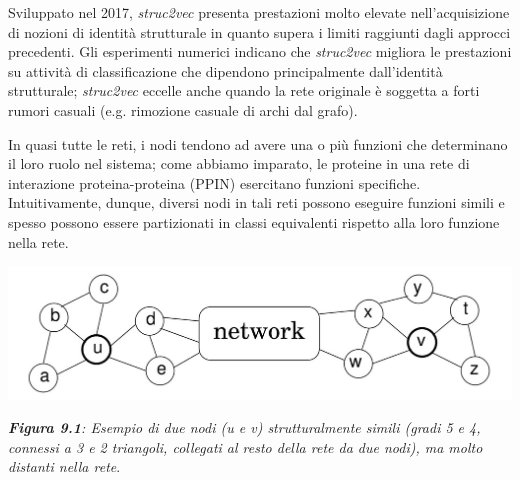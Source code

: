 \documentclass[11pt]{article}
\begin{document}
Sviluppato nel 2017, \textit{struc2vec} presenta prestazioni molto elevate nell'acquisizione di nozioni di identità strutturale in quanto supera i limiti raggiunti dagli approcci precedenti. Gli esperimenti numerici indicano che \textit{struc2vec} migliora le prestazioni su attività di classificazione che dipendono principalmente dall'identità strutturale; \textit{struc2vec} eccelle anche quando la rete originale è soggetta a forti rumori casuali (e.g. rimozione casuale di archi dal grafo).

In quasi tutte le reti, i nodi tendono ad avere una o più funzioni che determinano il loro ruolo nel sistema; come abbiamo imparato, le proteine in una rete di interazione proteina-proteina (PPIN) esercitano funzioni specifiche. 
Intuitivamente, dunque, diversi nodi in tali reti possono eseguire funzioni simili e spesso possono essere partizionati in classi equivalenti rispetto alla loro funzione nella rete.

\begin{center}
\includegraphics[scale=0.36]{struc1}

\begin{small}\textit{\textbf{Figura 9.1}: Esempio di due nodi (u e v) strutturalmente simili (gradi 5 e 4, connessi a 3 e 2 triangoli, collegati al resto della rete da due nodi), ma molto distanti nella rete}.\end{small}
\end{center}
\end{document}
